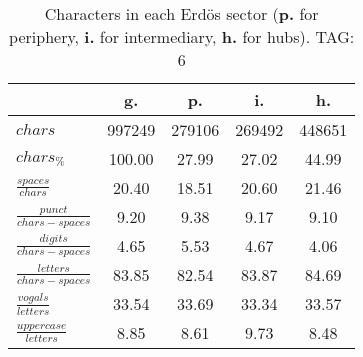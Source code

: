 \begin{table}[h!]
\begin{center}
\begin{tabular}{| l | c | c | c | c |}\hline
 & g. & p. & i. & h. \\\hline
$chars$ & 997249  & 279106  & 269492  & 448651 \\\hline
$chars_{\%}$ & 100.00  & 27.99  & 27.02  & 44.99 \\\hline
$\frac{spaces}{chars}$ & 20.40  & 18.51  & 20.60  & 21.46 \\\hline
$\frac{punct}{chars-spaces}$ & 9.20  & 9.38  & 9.17  & 9.10 \\\hline
$\frac{digits}{chars-spaces}$ & 4.65  & 5.53  & 4.67  & 4.06 \\\hline
$\frac{letters}{chars-spaces}$ & 83.85  & 82.54  & 83.87  & 84.69 \\\hline
$\frac{vogals}{letters}$ & 33.54  & 33.69  & 33.34  & 33.57 \\\hline
$\frac{uppercase}{letters}$ & 8.85  & 8.61  & 9.73  & 8.48 \\\hline
\end{tabular}
\caption{Characters in each Erd\"os sector ({{\bf p.}} for periphery, {{\bf i.}} for intermediary, 
    {{\bf h.}} for hubs). TAG: 6}
\end{center}
\end{table}